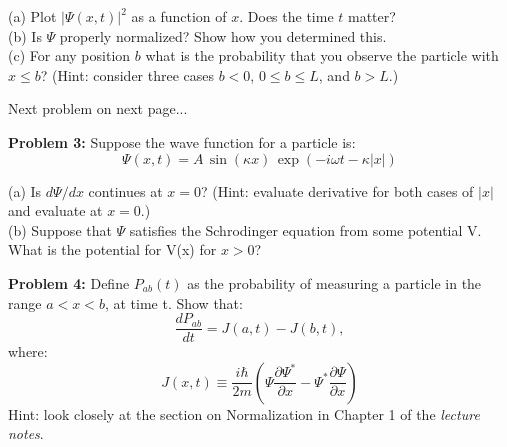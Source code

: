 \documentclass[12pt]{article}
\begin{document}
\noindent
(a) Plot $|\Psi(x,t)|^2$ as a function of $x$.  Does the time $t$ matter? \\[5pt]
(b) Is $\Psi$ properly normalized?  Show how you determined this.\\[5pt]
(c) For any position $b$ what is the probability that you observe the particle with $x \leq b$?  (Hint: consider three cases $b<0$, $0 \leq b \leq L$, and $b > L$.)


\vskip 1cm
\begin{center}
Next problem on next page...
\end{center}


\newpage
\noindent
{\bf Problem 3:} Suppose the wave function for a particle is:
\begin{displaymath}
  \Psi(x,t) = A \, \sin(\kappa x) \, \exp(-i\omega t-\kappa|x|)
\end{displaymath}

\noindent
(a) Is $d\Psi/dx$ continues at $x=0$?  (Hint: evaluate derivative for both cases of $|x|$ and evaluate at $x=0$.)\\

\noindent
(b) Suppose that $\Psi$ satisfies the Schrodinger equation from some potential V.  What is the potential for V(x) for $x > 0$?

\vskip 1cm
\noindent
    {\bf Problem 4:} Define $P_{ab}(t)$ as the probability of measuring a particle in the range $a< x < b$, at time t.  Show that:
\begin{displaymath}
  \frac{dP_{ab}}{dt} = J(a, t) - J(b, t),
\end{displaymath}
where:
\begin{displaymath}
  J(x, t) \equiv \frac{i \hbar}{2m}
  \left( \Psi \frac{\partial \Psi^*}{\partial x} - \Psi^* \frac{\partial \Psi}{\partial x}\right)
\end{displaymath}
Hint: look closely at the section on Normalization in Chapter 1 of the {\em lecture notes}.
\end{document}
